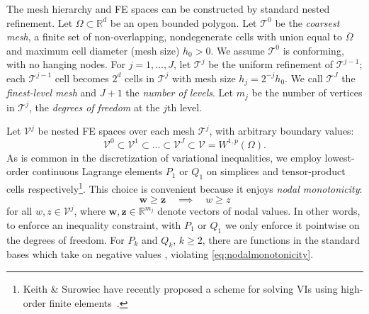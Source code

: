 \documentclass[review,hidelinks,onefignum,onetabnum]{siamart220329}
\newcommand{\RR}{\mathbb{R}}
\newcommand{\bw}{\mathbf{w}}
\newcommand{\bz}{\mathbf{z}}
\begin{document}
The mesh hierarchy and FE spaces can be constructed by standard nested refinement.  Let $\Omega \subset \RR^d$ be an open bounded polygon.  Let $\mathcal{T}^0$ be the \emph{coarsest mesh}, a finite set of non-overlapping, nondegenerate cells with union equal to $\overline{\Omega}$ and maximum cell diameter (mesh size) $h_0>0$.  We assume $\mathcal{T}^0$ is conforming, with no hanging nodes.  For $j=1,\dots,J$, let $\mathcal{T}^j$ be the uniform refinement of $\mathcal{T}^{j-1}$; each $\mathcal{T}^{j-1}$ cell becomes $2^d$ cells in $\mathcal{T}^j$ with mesh size $h_j = 2^{-j} h_0$.  We call $\mathcal{T}^J$ the \emph{finest-level mesh} and $J+1$ the \emph{number of levels}.  Let $m_j$ be the number of vertices in $\mathcal{T}^j$, the \emph{degrees of freedom} at the $j$th level.

Let $\mathcal{V}^j$ be nested FE spaces over each mesh $\mathcal{T}^j$, with arbitrary boundary values:
\begin{equation}
\mathcal{V}^0 \subset \mathcal{V}^1 \subset \dots \subset \mathcal{V}^J \subset \mathcal{V}=W^{1,p}(\Omega).  \label{eq:fe:nestedspaces}
\end{equation}
As is common in the discretization of variational inequalities, we employ lowest-order continuous Lagrange elements $P_1$ or $Q_1$ on simplices and tensor-product cells respectively\footnote{Keith \& Surowiec have recently proposed a scheme for solving VIs using high-order finite elements~\cite{Keith2023}.}. This choice is convenient because it enjoys \emph{nodal monotonicity}:
\begin{equation}
\bw \ge \bz \quad \implies \quad w \ge z \label{eq:nodalmonotonicity}
\end{equation}
for all $w,z \in \mathcal{V}^j$, where $\bw,\bz \in \RR^{m_j}$ denote vectors of nodal values. In other words, to enforce an inequality constraint, with $P_1$ or $Q_1$ we only enforce it pointwise on the degrees of freedom. For $P_k$ and $Q_k$, $k\ge 2$, there are functions in the standard bases which take on negative values \cite[Figure 1.7]{Elmanetal2014}, violating \eqref{eq:nodalmonotonicity}.
\end{document}
